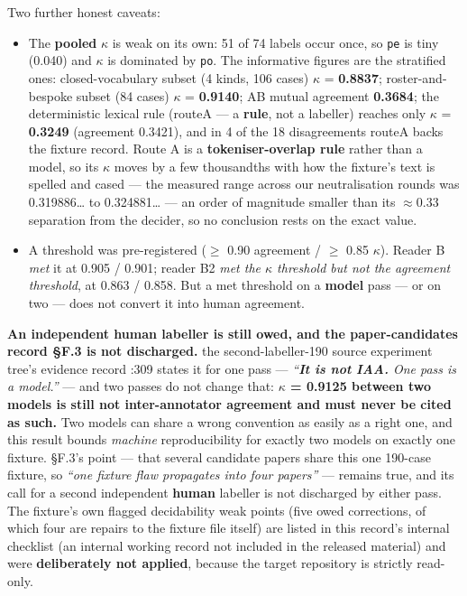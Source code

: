 \documentclass[11pt,a4paper]{article}
\begin{document}
Two further honest caveats:

\begin{itemize}
\item The \textbf{pooled} $\kappa$ is weak on its own: 51 of 74 labels occur once, so \texttt{pe} is tiny (0.040) and $\kappa$ is dominated by \texttt{po}. The informative figures are the stratified ones: closed-vocabulary subset (4 kinds, 106 cases) $\kappa$ = \textbf{0.8837}; roster-and-bespoke subset (84 cases) $\kappa$ = \textbf{0.9140}; AB mutual agreement \textbf{0.3684}; the deterministic lexical rule (routeA --- a \textbf{rule}, not a labeller) reaches only $\kappa$ = \textbf{0.3249} (agreement 0.3421), and in 4 of the 18 disagreements routeA backs the fixture record. Route A is a \textbf{tokeniser-overlap rule} rather than a model, so its $\kappa$ moves by a few thousandths with how the fixture's text is spelled and cased --- the measured range across our neutralisation rounds was 0.319886\ldots{} to 0.324881\ldots{} --- an order of magnitude smaller than its $\approx$0.33 separation from the decider, so no conclusion rests on the exact value.
\item A threshold was pre-registered ($\ge$ 0.90 agreement / $\ge$ 0.85 $\kappa$). Reader B \emph{met} it at 0.905 / 0.901; reader B2 \emph{met the $\kappa$ threshold but not the agreement threshold}, at 0.863 / 0.858. But a met threshold on a \textbf{model} pass --- or on two --- does not convert it into human agreement.
\end{itemize}

\textbf{An independent human labeller is still owed, and the paper-candidates record \S{}F.3 is not discharged.} the second-labeller-190 source experiment tree's evidence record :309 states it for one pass --- \emph{``\textbf{It is not IAA.} One pass is a model.''} --- and two passes do not change that: \textbf{$\kappa$ = 0.9125 between two models is still not inter-annotator agreement and must never be cited as such.} Two models can share a wrong convention as easily as a right one, and this result bounds \emph{machine} reproducibility for exactly two models on exactly one fixture. \S{}F.3's point --- that several candidate papers share this one 190-case fixture, so \emph{``one fixture flaw propagates into four papers''} --- remains true, and its call for a second independent \textbf{human} labeller is not discharged by either pass. The fixture's own flagged decidability weak points (five owed corrections, of which four are repairs to the fixture file itself) are listed in this record's internal checklist (an internal working record not included in the released material) and were \textbf{deliberately not applied}, because the target repository is strictly read-only.
\end{document}
